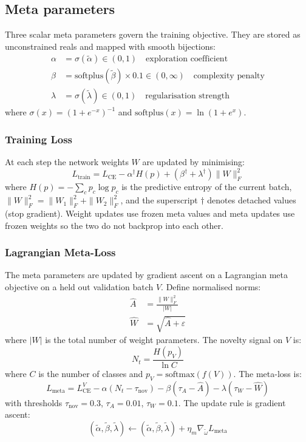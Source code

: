 \documentclass[conference]{IEEEtran}
\begin{document}
\subsection{Meta parameters}
Three scalar meta parameters govern the training objective. They are stored as unconstrained reals and mapped with smooth bijections:
\begin{align}
    \alpha &= \sigma(\tilde{\alpha}) \in (0, 1) \quad \text{exploration coefficient} \\
    \beta &= \mathrm{softplus}(\tilde{\beta}) \times 0.1 \in (0, \infty) \quad \text{complexity penalty} \\
    \lambda &= \sigma(\tilde{\lambda}) \in (0, 1) \quad \text{regularisation strength}
\end{align}
where $\sigma(x) = (1 + e^{-x})^{-1}$ and $\mathrm{softplus}(x) = \ln(1 + e^x)$.

\subsubsection{Training Loss}
At each step the network weights $W$ are updated by minimising:
\begin{equation}
    L_{\mathrm{train}} = L_{\mathrm{CE}} - \alpha^{\dagger} H(p) + (\beta^{\dagger} + \lambda^{\dagger}) \|W\|_F^2
\end{equation}
where $H(p) = -\sum_c p_c \log p_c$ is the predictive entropy of the current batch, $\|W\|_F^2 = \|W_1\|_F^2 + \|W_2\|_F^2$, and the superscript $\dagger$ denotes detached values (stop gradient). Weight updates use frozen meta values and meta updates use frozen weights so the two do not backprop into each other.

\subsubsection{Lagrangian Meta-Loss}
The meta parameters are updated by gradient ascent on a Lagrangian meta objective on a held out validation batch $V$. Define normalised norms:
\begin{align}
    \hat{A} &= \frac{\|W\|_F^2}{|W|} \\
    \hat{W} &= \sqrt{\hat{A} + \varepsilon}
\end{align}
where $|W|$ is the total number of weight parameters. The novelty signal on $V$ is:
\begin{equation}
    N_t = \frac{H(p_V)}{\ln C}
\end{equation}
where $C$ is the number of classes and $p_V = \mathrm{softmax}(f(V))$. The meta-loss is:
\begin{equation}
    L_{\mathrm{meta}} = L_{\mathrm{CE}}^V - \alpha(N_t - \tau_{\mathrm{nov}}) - \beta(\tau_A - \hat{A}) - \lambda(\tau_W - \hat{W})
\end{equation}
with thresholds $\tau_{\mathrm{nov}} = 0.3$, $\tau_A = 0.01$, $\tau_W = 0.1$. The update rule is gradient ascent:
\begin{equation}
    (\tilde{\alpha}, \tilde{\beta}, \tilde{\lambda}) \leftarrow (\tilde{\alpha}, \tilde{\beta}, \tilde{\lambda}) + \eta_m \nabla_{\tilde{\omega}} L_{\mathrm{meta}}
\end{equation}
\end{document}
